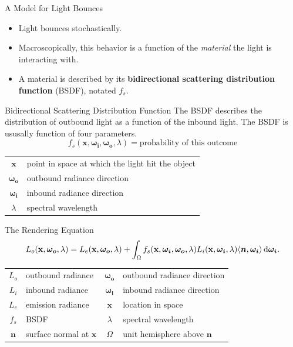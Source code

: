 \documentclass[10pt]{beamer}
\DeclarePairedDelimiter\ip{\langle }{\rangle}
\begin{document}
\begin{frame}{A Model for Light Bounces}
  \begin{itemize}
  \item Light bounces stochastically.
  \item Macroscopically, this behavior is a function of the \textit{material} the light is interacting with.
  \item A material is described by its \textbf{bidirectional scattering distribution function} (BSDF), notated \(f_s\).
  \end{itemize}
\end{frame}

\begin{frame}{Bidirectional Scattering Distribution Function}
  The BSDF describes the distribution of outbound light as a function of the inbound light.
  The BSDF is ususally function of four parameters.
  \[f_s(\mathbf x, \bm{\omega_i}, \bm{\omega_o}, \lambda) = \text{probability of this outcome}\]

  \hrulefill

  \begin{center}
    \begin{tabu}{cl}
      \(\mathbf x\) & point in space at which the light hit the object\\
      \(\bm{\omega_o}\) & outbound radiance direction\\
      \(\bm{\omega_i}\) & inbound radiance direction\\
      \(\lambda\) & spectral wavelength\\
    \end{tabu}
  \end{center}

\end{frame}

\begin{frame}{The Rendering Equation}
  \[L_{o}(\mathbf x, \bm {\omega_{o}}, \lambda) = L_{e}(\mathbf x, \bm{\omega_o}, \lambda) + \int_\Omega f_s(\mathbf x, \bm{\omega_i}, \bm{\omega_o}, \lambda)L_i(\mathbf x, \bm{\omega_i}, \lambda)\ip{\bm n, \bm{\omega_i}} \dif \bm{\omega_i}.\]

  \hrulefill

  \begin{center}
    \begin{tabu}{clcl}
      \(L_{o}\)& outbound radiance & \(\bm{\omega_o}\)& outbound radiance direction\\
      \(L_{i}\)& inbound radiance & \(\bm{\omega_i}\) &inbound radiance direction\\
      \(L_{e}\)& emission radiance & \(\mathbf x\) &location in space\\
      \(f_s\) & BSDF & \(\lambda\)& spectral wavelength\\
       \(\bm n\)& surface normal at \(\mathbf x\) & \(\Omega\) & unit hemisphere above \(\bm n\)
    \end{tabu}
  \end{center}
\end{frame}
\end{document}
